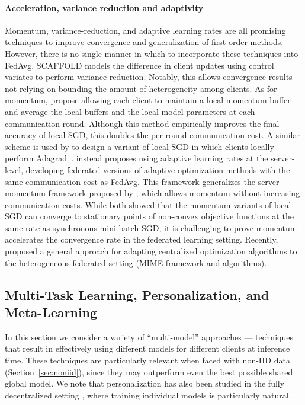\documentclass[11pt]{article}
\begin{document}
\paragraph{Acceleration, variance reduction and adaptivity}
Momentum, variance-reduction, and adaptive learning rates are all promising techniques to improve convergence and generalization of first-order methods. However, there is no single manner in which to incorporate these techniques into FedAvg. SCAFFOLD \citep{karimireddy2019scaffold} models the difference in client updates using control variates to perform variance reduction. Notably, this allows convergence results not relying on bounding the amount of heterogeneity among clients. As for momentum, \citet{yu2019linear} propose allowing each client to maintain a local momentum buffer and average the local buffers and the local model parameters at each communication round. Although this method empirically improves the final accuracy of local SGD, this doubles the per-round communication cost. A similar scheme is used by \citet{xie2019local} to design a variant of local SGD in which clients locally perform Adagrad~\citep{mcmahan2010adaptive, duchi2011adaptive}. \citet{reddi2020adaptive} instead proposes using adaptive learning rates at the server-level, developing federated versions of adaptive optimization methods with the same communication cost as FedAvg. This framework generalizes the server momentum framework proposed by \citet{hsu2019measuring,wang2019slowmo}, which allows momentum without increasing communication costs. While both \citep{yu2019linear,wang2019slowmo} showed that the momentum variants of local SGD can converge to stationary points of non-convex objective functions at the same rate as synchronous mini-batch SGD, it is challenging to prove momentum accelerates the convergence rate in the federated learning setting. Recently, \citet{karimireddy2020mime} proposed a general approach for adapting centralized optimization algorithms to the heterogeneous federated setting (MIME framework and algorithms).




\subsection{Multi-Task Learning, Personalization, and Meta-Learning}
\label{sec:multimodel}

In this section we consider a variety of ``multi-model'' approaches --- techniques that result in effectively using different models for different clients at inference time. These techniques are particularly relevant when faced with non-IID data (Section~\ref{sec:noniid}), since they may outperform even the best possible shared global model. We note that personalization has also been studied in the fully decentralized setting \citep{Vanhaesebrouck2017,Bellet2018a,Zantedeschi2019,Almeida2018}, where training individual models is particularly natural.
\end{document}
